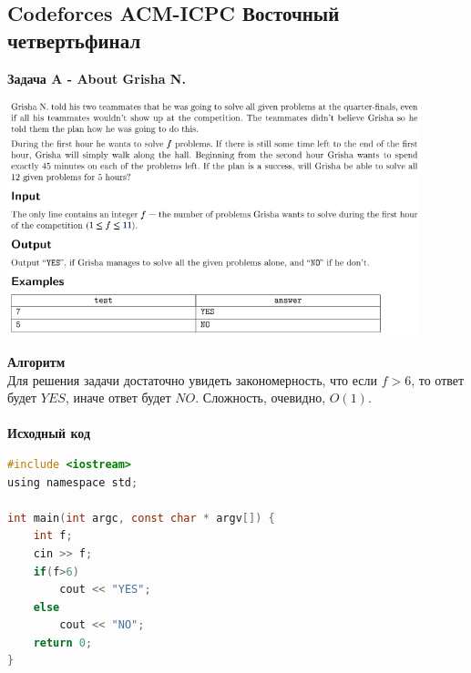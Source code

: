 \documentclass[a4paper,12pt]{article}
\begin{document}
%
%
\newpage
\subsection{Codeforces ACM-ICPC Восточный четвертьфинал}

\textbf{{\large Задача A - About Grisha N.}} \\
\begin{center}
\includegraphics[width=0.9\textwidth]{CT_ACM_EAST/CT_ACM_EAST_A.png}\\ [1cm]
\end{center}
\textbf{{\large Алгоритм}} \\
Для решения задачи достаточно увидеть закономерность, что если $f > 6$, то ответ будет $YES$, иначе ответ будет $NO$. Сложность, очевидно, $O(1)$.\\ 
\\
\textbf{{\large Исходный код}}
\begin{lstlisting}[language=C]
#include <iostream>
using namespace std;

int main(int argc, const char * argv[]) {
    int f;
    cin >> f;
    if(f>6)
        cout << "YES";
    else
        cout << "NO";
    return 0;
}
\end{lstlisting}
\end{document}
